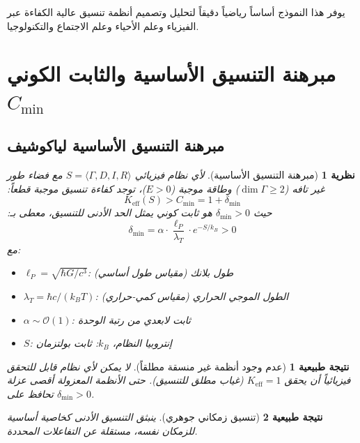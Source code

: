 \documentclass[11pt,a4paper]{article}
\newtheorem{theorem}{نظرية}
\newtheorem{corollary}{نتيجة طبيعية}
\begin{document}
	يوفر هذا النموذج أساساً رياضياً دقيقاً لتحليل وتصميم أنظمة تنسيق عالية الكفاءة عبر الفيزياء وعلم الأحياء وعلم الاجتماع والتكنولوجيا.
	
	\section{مبرهنة التنسيق الأساسية والثابت الكوني \texorpdfstring{$C_{\min}$}{C\_min}}
	\label{sec:fundamental-theorem}
	
	\subsection{مبرهنة التنسيق الأساسية لياكوشيف}
	
	\begin{theorem}[مبرهنة التنسيق الأساسية]
		لأي نظام فيزيائي $S = \langle \Gamma, D, I, R \rangle$ مع فضاء طور غير تافه ($\dim\Gamma \geq 2$) وطاقة موجبة ($E > 0$)، توجد كفاءة تنسيق موجبة قطعاً:
		\begin{equation}
			\boxed{K_{\mathrm{eff}}(S) > C_{\min} = 1 + \delta_{\min}}
		\end{equation}
		حيث $\delta_{\min} > 0$ هو ثابت كوني يمثل الحد الأدنى للتنسيق، معطى بـ:
		\begin{equation}
			\delta_{\min} = \alpha \cdot \frac{\ell_P}{\lambda_T} \cdot e^{-S/k_B} > 0
		\end{equation}
		مع:
		\begin{itemize}
			\item $\ell_P = \sqrt{\hbar G/c^3}$: طول بلانك (مقياس طول أساسي)
			\item $\lambda_T = \hbar c/(k_B T)$: الطول الموجي الحراري (مقياس كمي-حراري)
			\item $\alpha \sim \mathcal{O}(1)$: ثابت لابعدي من رتبة الوحدة
			\item $S$: إنتروبيا النظام، $k_B$: ثابت بولتزمان
		\end{itemize}
	\end{theorem}
	
	\begin{corollary}[عدم وجود أنظمة غير منسقة مطلقاً]
		لا يمكن لأي نظام قابل للتحقق فيزيائياً أن يحقق $K_{\mathrm{eff}} = 1$ (غياب مطلق للتنسيق). حتى الأنظمة المعزولة أقصى عزلة تحافظ على $\delta_{\min} > 0$.
	\end{corollary}
	
	\begin{corollary}[تنسيق زمكاني جوهري]
		ينبثق التنسيق الأدنى كخاصية أساسية للزمكان نفسه، مستقلة عن التفاعلات المحددة.
	\end{corollary}
	
\end{document}
